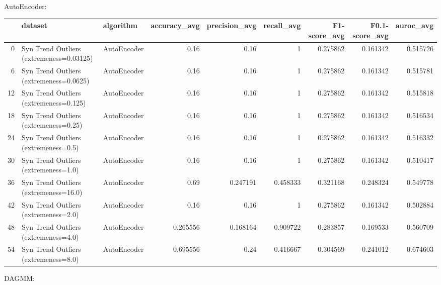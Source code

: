 AutoEncoder:

\begin{tabular}{rllrrrrrr}
\hline
    & dataset                                  & algorithm   &   accuracy\_avg &   precision\_avg &   recall\_avg &   F1-score\_avg &   F0.1-score\_avg &   auroc\_avg \\
\hline
  0 & Syn Trend Outliers (extremeness=0.03125) & AutoEncoder &       0.16     &        0.16     &     1        &       0.275862 &         0.161342 &    0.515726 \\
  6 & Syn Trend Outliers (extremeness=0.0625)  & AutoEncoder &       0.16     &        0.16     &     1        &       0.275862 &         0.161342 &    0.515781 \\
 12 & Syn Trend Outliers (extremeness=0.125)   & AutoEncoder &       0.16     &        0.16     &     1        &       0.275862 &         0.161342 &    0.515818 \\
 18 & Syn Trend Outliers (extremeness=0.25)    & AutoEncoder &       0.16     &        0.16     &     1        &       0.275862 &         0.161342 &    0.516534 \\
 24 & Syn Trend Outliers (extremeness=0.5)     & AutoEncoder &       0.16     &        0.16     &     1        &       0.275862 &         0.161342 &    0.516332 \\
 30 & Syn Trend Outliers (extremeness=1.0)     & AutoEncoder &       0.16     &        0.16     &     1        &       0.275862 &         0.161342 &    0.510417 \\
 36 & Syn Trend Outliers (extremeness=16.0)    & AutoEncoder &       0.69     &        0.247191 &     0.458333 &       0.321168 &         0.248324 &    0.549778 \\
 42 & Syn Trend Outliers (extremeness=2.0)     & AutoEncoder &       0.16     &        0.16     &     1        &       0.275862 &         0.161342 &    0.502884 \\
 48 & Syn Trend Outliers (extremeness=4.0)     & AutoEncoder &       0.265556 &        0.168164 &     0.909722 &       0.283857 &         0.169533 &    0.560709 \\
 54 & Syn Trend Outliers (extremeness=8.0)     & AutoEncoder &       0.695556 &        0.24     &     0.416667 &       0.304569 &         0.241012 &    0.674603 \\
\hline
\end{tabular}

DAGMM:

